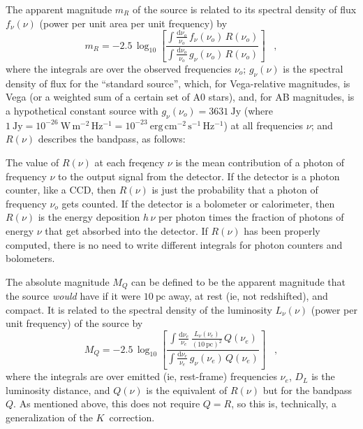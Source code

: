 \documentclass[preprint]{aastex}
\newcommand{\kcorrection}{$K$~correction}
\begin{document}
The apparent magnitude $m_R$ of the source is related to its spectral
density of flux $f_{\nu}(\nu)$ (power per unit area per unit
frequency) by
\begin{equation}
m_R = -2.5\,\log_{10}\left[
  \frac{\displaystyle
          \int\frac{\mathrm{d}\nu_o}{\nu_o}\,f_{\nu}(\nu_o)\,R(\nu_o)}
       {\displaystyle
          \int\frac{\mathrm{d}\nu_o}{\nu_o}\,g_{\nu}(\nu_o)\,R(\nu_o)}
\right] \;\;\;,
\end{equation}
where the integrals are over the observed frequencies $\nu_o$;
$g_{\nu}(\nu)$ is the spectral density of flux for the ``standard
source'', which, for Vega-relative magnitudes, is Vega (or a weighted
sum of a certain set of A0 stars), and, for AB magnitudes, is a
hypothetical constant source with $g_{\nu}(\nu_o)=3631~\mathrm{Jy}$
(where $1~\mathrm{Jy}= 10^{-26}~\mathrm{W\,m^{-2}\,Hz^{-1}}=
10^{-23}~\mathrm{erg\,cm^{-2}\,s^{-1}\,Hz^{-1}}$) at all frequencies
$\nu$; and $R(\nu)$ describes the bandpass, as follows:

The value of $R(\nu)$ at each freqency $\nu$ is the mean contribution
of a photon of frequency $\nu$ to the output signal from the detector.
If the detector is a photon counter, like a CCD, then $R(\nu)$ is just
the probability that a photon of frequency $\nu_o$ gets counted.  If
the detector is a bolometer or calorimeter, then $R(\nu)$ is the
energy deposition $h\,\nu$ per photon times the fraction of photons of
energy $\nu$ that get absorbed into the detector.  If $R(\nu)$ has
been properly computed, there is no need to write different integrals
for photon counters and bolometers.

The absolute magnitude $M_Q$ can be defined to be the apparent
magnitude that the source \emph{would} have if it were
$10~\mathrm{pc}$ away, at rest (ie, not redshifted), and compact.  It
is related to the spectral density of the luminosity $L_{\nu}(\nu)$
(power per unit frequency) of the source by
\begin{equation}
M_Q = -2.5\,\log_{10}\left[
  \frac{\displaystyle
          \int\frac{\mathrm{d}\nu_e}{\nu_e}\,
              \frac{L_{\nu}(\nu_e)}{(10~\mathrm{pc})^2}\,Q(\nu_e)}
       {\displaystyle
          \int\frac{\mathrm{d}\nu_e}{\nu_e}\,g_{\nu}(\nu_e)\,Q(\nu_e)}
\right] \;\;\;,
\end{equation}
where the integrals are over emitted (ie, rest-frame) frequencies
$\nu_e$, $D_L$ is the luminosity distance, and $Q(\nu)$ is the
equivalent of $R(\nu)$ but for the bandpass $Q$.  As mentioned above,
this does not require $Q=R$, so this is, technically, a generalization
of the \kcorrection.
\end{document}
